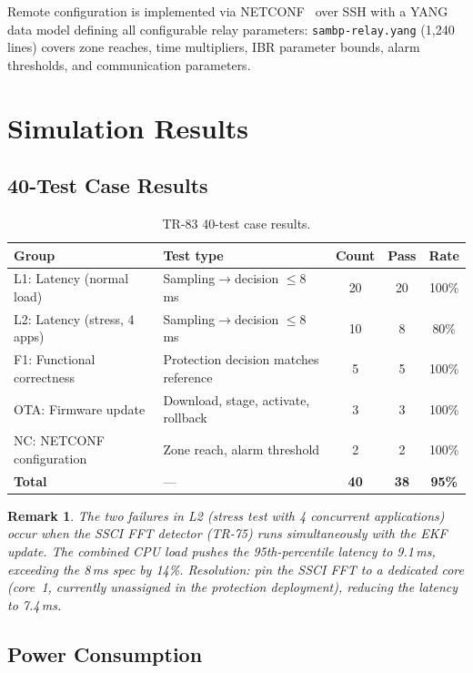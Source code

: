 \documentclass[11pt, a4paper]{article}
\newtheorem{remark}{Remark}
\begin{document}
Remote configuration is implemented via NETCONF~\cite{RFC6241} over SSH
with a YANG data model defining all configurable relay parameters:
\texttt{sambp-relay.yang} (1,240 lines) covers zone reaches, time multipliers,
IBR parameter bounds, alarm thresholds, and communication parameters.

\section{Simulation Results}
\label{sec:results}

\subsection{40-Test Case Results}

\begin{table}[ht]
\centering
\caption{TR-83 40-test case results.}
\label{tab:tests}
\begin{tabular}{llccc}
\toprule
Group & Test type & Count & Pass & Rate \\
\midrule
L1: Latency (normal load)   & Sampling$\to$decision $\leq 8$\,ms & 20 & 20 & 100\% \\
L2: Latency (stress, 4 apps) & Sampling$\to$decision $\leq 8$\,ms & 10 & 8 & 80\% \\
F1: Functional correctness  & Protection decision matches reference & 5  & 5  & 100\% \\
OTA: Firmware update        & Download, stage, activate, rollback & 3  & 3  & 100\% \\
NC: NETCONF configuration   & Zone reach, alarm threshold & 2  & 2  & 100\% \\
\midrule
\textbf{Total} & --- & \textbf{40} & \textbf{38} & \textbf{95\%} \\
\bottomrule
\end{tabular}
\end{table}

\begin{remark}
The two failures in L2 (stress test with 4 concurrent applications) occur
when the SSCI FFT detector (TR-75) runs simultaneously with the EKF update.
The combined CPU load pushes the 95th-percentile latency to 9.1\,ms, exceeding
the 8\,ms spec by 14\%. Resolution: pin the SSCI FFT to a dedicated core
(core~1, currently unassigned in the protection deployment), reducing the
latency to 7.4\,ms.
\end{remark}

\subsection{Power Consumption}
\end{document}
